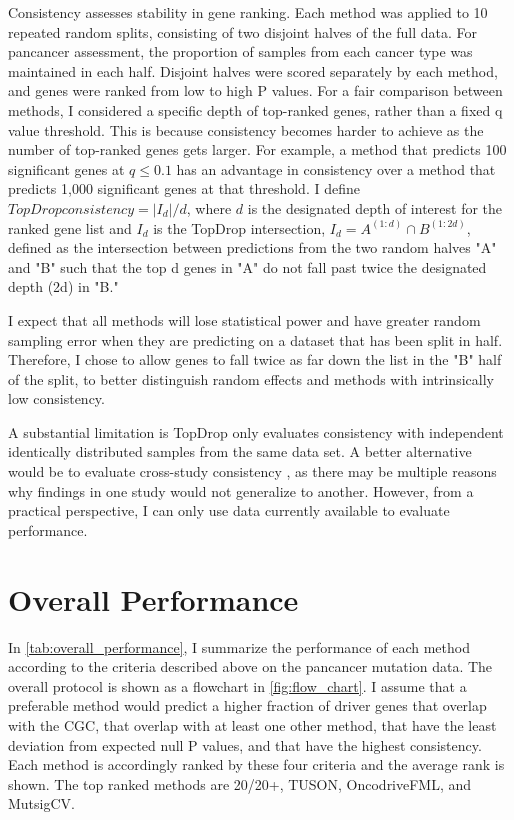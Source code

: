 Consistency assesses stability in gene ranking. Each method was applied to 10 repeated random splits, consisting of two disjoint halves of the full data. For pancancer assessment, the proportion of samples from each cancer type was maintained in each half. Disjoint halves were scored separately by each method, and genes were ranked from low to high P values. For a fair comparison between methods, I considered a specific depth of top-ranked genes, rather than a fixed q value threshold. This is because consistency becomes harder to achieve as the number of top-ranked genes gets larger. For example, a method that predicts 100 significant genes at $q \leq 0.1$ has an advantage in consistency over a method that predicts 1,000 significant genes at that threshold. I define $TopDrop consistency=|I_d |/d$, where $d$ is the designated depth of interest for the ranked gene list and $I_d$ is the TopDrop intersection, $I_d=A^{(1:d)} \cap B^{(1:2d)}$, defined as the intersection between predictions from the two random halves "A" and "B" such that the top d genes in "A" do not fall past twice the designated depth (2d) in "B."

I expect that all methods will lose statistical power and have greater random sampling error when they are predicting on a dataset that has been split in half. Therefore, I chose to allow genes to fall twice as far down the list in the "B" half of the split, to better distinguish random effects and methods with intrinsically low consistency.

A substantial limitation is TopDrop only evaluates consistency with independent identically distributed samples from the same data set. A better alternative would be to evaluate cross-study consistency \cite{RN157}, as there may be multiple reasons why findings in one study would not generalize to another. However, from a practical perspective, I can only use data currently available to evaluate performance.

\section{Overall Performance}

In \autoref{tab:overall_performance}, I summarize the performance of each method according to the criteria described above on the pancancer mutation data. The overall protocol is shown as a flowchart in \autoref{fig:flow_chart}. I assume that a preferable method would predict a higher fraction of driver genes that overlap with the CGC, that overlap with at least one other method, that have the least deviation from expected null P values, and that have the highest consistency. Each method is accordingly ranked by these four criteria and the average rank is shown. The top ranked methods are 20/20+, TUSON, OncodriveFML, and MutsigCV.

